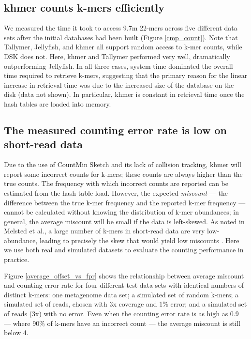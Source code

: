 \documentclass{article}
\begin{document}
\subsection{khmer counts k-mers efficiently}

We measured the time it took to access 9.7m 22-mers across five
different data sets after the initial databases had been built (Figure
\ref{cmp_count}).  Note that Tallymer, Jellyfish, and khmer all
support random access to k-mer counts, while DSK does not. Here,
khmer and Tallymer performed very well, dramatically outperforming
Jellyfish.  In all three cases, system time dominated the overall time
required to retrieve k-mers, suggesting that the primary reason for
the linear increase in retrieval time was due to the increased size of
the database on the disk (data not shown).  In particular, khmer is
constant in retrieval time once the hash tables are loaded into
memory.

\subsection{The measured counting error rate is low on short-read data}

Due to the use of CountMin Sketch and its lack of collision tracking,
khmer will report some incorrect counts for k-mers; these counts are
always higher than the true counts.  The frequency with which
incorrect counts are reported can be estimated from the hash table
load.  However, the expected {\em miscount} --- the difference
between the true k-mer frequency and the reported k-mer frequency --- cannot be
calculated without knowing the distribution of k-mer abundances; in
general, the average miscount will be small if the data is
left-skewed.  As noted in Melsted et al., a large number of k-mers in
short-read data are very low-abundance, leading to precisely the skew
that would yield low miscounts \cite{Melsted2011}.  Here we use both
real and simulated datasets to evaluate the counting performance in
practice.

Figure \ref{average_offset_vs_fpr} shows the relationship between
average miscount and counting error rate for four different test data
sets with identical numbers of distinct k-mers: one metagenome data
set; a simulated set of random k-mers; a simulated set of reads,
chosen with 3x coverage and 1\% error; and a simulated set of reads (3x)
with no error.  Even when the counting error rate is as high as 0.9 ---
where 90\% of k-mers have an incorrect count --- the average miscount is still
below 4.
\end{document}
